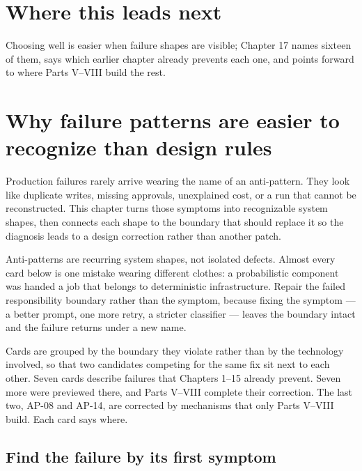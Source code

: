\section{Where this leads next}

Choosing well is easier when failure shapes are visible; Chapter 17 names sixteen of them, says which earlier chapter already prevents each one, and points forward to where Parts V–VIII build the rest.\par



\section{Why failure patterns are easier to recognize than design rules}

Production failures rarely arrive wearing the name of an anti-pattern. They look like duplicate writes, missing approvals, unexplained cost, or a run that cannot be reconstructed. This chapter turns those symptoms into recognizable system shapes, then connects each shape to the boundary that should replace it so the diagnosis leads to a design correction rather than another patch.\par

Anti-patterns are recurring system shapes, not isolated defects. Almost every card below is one mistake wearing different clothes: a probabilistic component was handed a job that belongs to deterministic infrastructure. Repair the failed responsibility boundary rather than the symptom, because fixing the symptom — a better prompt, one more retry, a stricter classifier — leaves the boundary intact and the failure returns under a new name.\par

Cards are grouped by the boundary they violate rather than by the technology involved, so that two candidates competing for the same fix sit next to each other. Seven cards describe failures that Chapters 1–15 already prevent. Seven more were previewed there, and Parts V–VIII complete their correction. The last two, AP-08 and AP-14, are corrected by mechanisms that only Parts V–VIII build. Each card says where.\par

\subsection{Find the failure by its first symptom}

